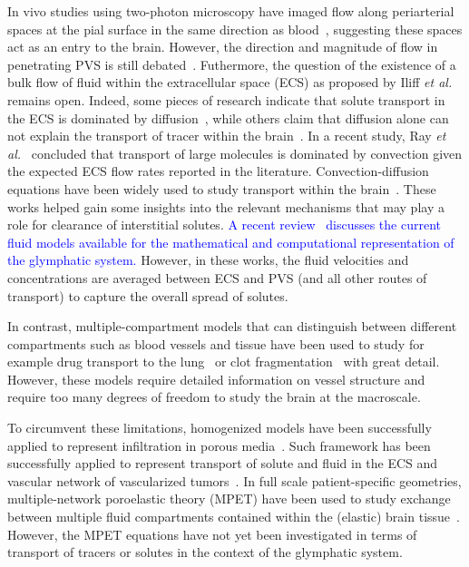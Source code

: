 \documentclass[10pt]{article}
\newcommand{\etal}{\emph{et al.}\;}
\newcommand{\1}{^{(1)}}
\newcommand{\2}{^{(2)}}
\newcommand{\corr}[1]{\textcolor{blue}{#1}}
\begin{document}
In vivo studies using two-photon microscopy have imaged flow along periarterial spaces at the pial surface in the same direction as blood~\cite{bedussi-2018-paravascular,mestre_flow_2018}, suggesting these spaces act as an entry to the brain. However,  the direction and magnitude of flow in penetrating PVS is still debated~\cite{bakker2019paravascular}. Futhermore, the question of the existence of a bulk flow of fluid within the extracellular space (ECS) as proposed by Iliff \etal~\cite{Iliff_2012_PVS} remains open. Indeed, some pieces of research indicate that solute transport in the ECS is dominated by diffusion~\cite{asgari_glymphatic_2016, Holter9894, smith2019going}, while others claim that diffusion alone can not explain the transport of tracer within the brain~\cite{valnes_apparent_2020, ray2021quantitative,thomas2022theoretical}. In a recent study, Ray \etal~\cite{ray_analysis_2019} concluded that transport of large molecules is dominated by convection given the expected ECS flow rates reported in the literature. Convection-diffusion equations have been widely used to study transport within the brain~\cite{ray_analysis_2019,valnes_apparent_2020,Holter9894,nicholson-1981-ion, stoverud_modeling_2012, ray2021quantitative, croci2019uncertainty}. These works helped gain some insights into the relevant mechanisms that may play a role for clearance of interstitial solutes. \corr{A recent review~\cite{kelley2023cerebrospinal} discusses the current fluid models available for the mathematical and computational representation of the glymphatic system.} %
However, in these works, the fluid velocities and concentrations are averaged between ECS and PVS (and all other routes of transport) to capture the overall spread of solutes. 

In contrast, multiple-compartment models that can distinguish between different compartments such as blood vessels and tissue have been used to study for example drug transport to the lung~\cite{Erbertseder-2012-lung} or clot fragmentation~\cite{Payne-clot-2021} with great detail. However, these models require detailed information on vessel structure and require too many degrees of freedom to study the brain at the macroscale. 

To circumvent these limitations, homogenized models have been successfully applied to represent infiltration in porous media~\cite{Hornung-1996-homogenization}. Such framework has been successfully applied to represent transport of solute and fluid in the ECS and vascular network of vascularized tumors~\cite{ shipley_multiscale_2010,shipley-four-comp, Penta-homogenization-2015}.   
In full scale patient-specific geometries, multiple-network poroelastic theory (MPET) have been used to study exchange between multiple fluid compartments contained within the (elastic) brain tissue~\cite{Biot-1941-Consolidation,Biot-1955-Consolidation2, Bai-MPET-1993,tully_ventikos_2011,Vardakis-2016-cerebral,Guo-2018-MPET,Guo-2019-MPET}. However, the MPET equations have not yet been investigated in terms of transport of tracers or solutes in the context of the glymphatic system.
\end{document}
